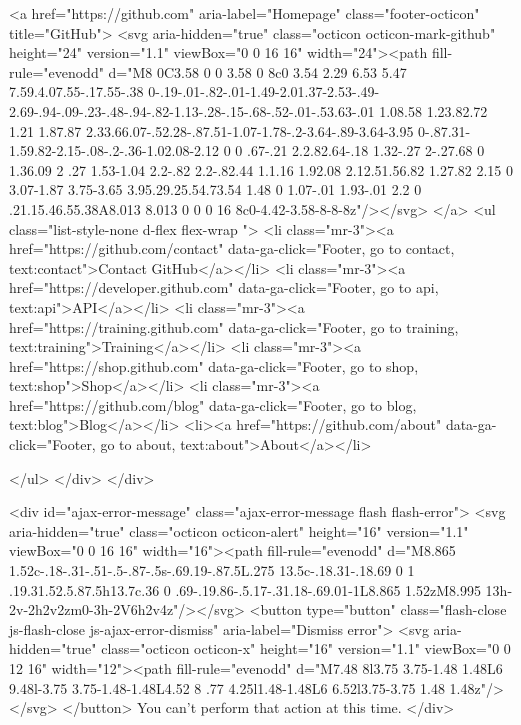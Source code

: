     <a href="https://github.com" aria-label="Homepage" class="footer-octicon" title="GitHub">
      <svg aria-hidden="true" class="octicon octicon-mark-github" height="24" version="1.1" viewBox="0 0 16 16" width="24"><path fill-rule="evenodd" d="M8 0C3.58 0 0 3.58 0 8c0 3.54 2.29 6.53 5.47 7.59.4.07.55-.17.55-.38 0-.19-.01-.82-.01-1.49-2.01.37-2.53-.49-2.69-.94-.09-.23-.48-.94-.82-1.13-.28-.15-.68-.52-.01-.53.63-.01 1.08.58 1.23.82.72 1.21 1.87.87 2.33.66.07-.52.28-.87.51-1.07-1.78-.2-3.64-.89-3.64-3.95 0-.87.31-1.59.82-2.15-.08-.2-.36-1.02.08-2.12 0 0 .67-.21 2.2.82.64-.18 1.32-.27 2-.27.68 0 1.36.09 2 .27 1.53-1.04 2.2-.82 2.2-.82.44 1.1.16 1.92.08 2.12.51.56.82 1.27.82 2.15 0 3.07-1.87 3.75-3.65 3.95.29.25.54.73.54 1.48 0 1.07-.01 1.93-.01 2.2 0 .21.15.46.55.38A8.013 8.013 0 0 0 16 8c0-4.42-3.58-8-8-8z"/></svg>
</a>
    <ul class="list-style-none d-flex flex-wrap ">
        <li class="mr-3"><a href="https://github.com/contact" data-ga-click="Footer, go to contact, text:contact">Contact GitHub</a></li>
      <li class="mr-3"><a href="https://developer.github.com" data-ga-click="Footer, go to api, text:api">API</a></li>
      <li class="mr-3"><a href="https://training.github.com" data-ga-click="Footer, go to training, text:training">Training</a></li>
      <li class="mr-3"><a href="https://shop.github.com" data-ga-click="Footer, go to shop, text:shop">Shop</a></li>
        <li class="mr-3"><a href="https://github.com/blog" data-ga-click="Footer, go to blog, text:blog">Blog</a></li>
        <li><a href="https://github.com/about" data-ga-click="Footer, go to about, text:about">About</a></li>

    </ul>
  </div>
</div>



  <div id="ajax-error-message" class="ajax-error-message flash flash-error">
    <svg aria-hidden="true" class="octicon octicon-alert" height="16" version="1.1" viewBox="0 0 16 16" width="16"><path fill-rule="evenodd" d="M8.865 1.52c-.18-.31-.51-.5-.87-.5s-.69.19-.87.5L.275 13.5c-.18.31-.18.69 0 1 .19.31.52.5.87.5h13.7c.36 0 .69-.19.86-.5.17-.31.18-.69.01-1L8.865 1.52zM8.995 13h-2v-2h2v2zm0-3h-2V6h2v4z"/></svg>
    <button type="button" class="flash-close js-flash-close js-ajax-error-dismiss" aria-label="Dismiss error">
      <svg aria-hidden="true" class="octicon octicon-x" height="16" version="1.1" viewBox="0 0 12 16" width="12"><path fill-rule="evenodd" d="M7.48 8l3.75 3.75-1.48 1.48L6 9.48l-3.75 3.75-1.48-1.48L4.52 8 .77 4.25l1.48-1.48L6 6.52l3.75-3.75 1.48 1.48z"/></svg>
    </button>
    You can't perform that action at this time.
  </div>


